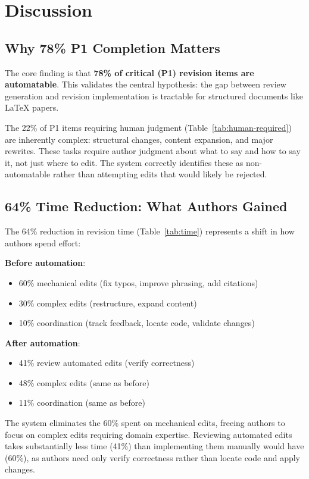 \section{Discussion}
\label{sec:discussion}

\subsection{Why 78\% P1 Completion Matters}

The core finding is that \textbf{78\% of critical (P1) revision items are automatable}. This validates the central hypothesis: the gap between review generation and revision implementation is tractable for structured documents like LaTeX papers.

The 22\% of P1 items requiring human judgment (Table~\ref{tab:human-required}) are inherently complex: structural changes, content expansion, and major rewrites. These tasks require author judgment about what to say and how to say it, not just where to edit. The system correctly identifies these as non-automatable rather than attempting edits that would likely be rejected.

\subsection{64\% Time Reduction: What Authors Gained}

The 64\% reduction in revision time (Table~\ref{tab:time}) represents a shift in how authors spend effort:

\textbf{Before automation}:
\begin{itemize}
\item 60\% mechanical edits (fix typos, improve phrasing, add citations)
\item 30\% complex edits (restructure, expand content)
\item 10\% coordination (track feedback, locate code, validate changes)
\end{itemize}

\textbf{After automation}:
\begin{itemize}
\item 41\% review automated edits (verify correctness)
\item 48\% complex edits (same as before)
\item 11\% coordination (same as before)
\end{itemize}

The system eliminates the 60\% spent on mechanical edits, freeing authors to focus on complex edits requiring domain expertise. Reviewing automated edits takes substantially less time (41\%) than implementing them manually would have (60\%), as authors need only verify correctness rather than locate code and apply changes.


